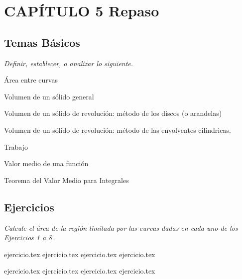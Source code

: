 
\section*{CAPÍTULO 5 \quad Repaso}

\subsection*{Temas Básicos}

\noindent \textit{Definir, establecer, o analizar lo siguiente.}
\begin{enumerate}
    \begin{minipage}{0.45\textwidth}
    \item Área entre curvas
    \item Volumen de un sólido general
    \item Volumen de un sólido de revolución: método de los discos (o arandelas)
    \item Volumen de un sólido de revolución: método de las envolventes cilíndricas.
    \end{minipage}%
    \begin{minipage}{0.45\textwidth}
    \item Trabajo
    \item Valor medio de una función
    \item Teorema del Valor Medio para Integrales
    \end{minipage}
\end{enumerate}

\subsection*{Ejercicios}

\noindent \textit{Calcule el área de la región limitada por las curvas dadas en cada uno de los Ejercicios 1 a 8.}

\begin{enumerate}
    \begin{minipage}{0.45\textwidth}
    {ejercicio.tex}
    {ejercicio.tex}
    {ejercicio.tex}
    {ejercicio.tex}
    \end{minipage}%
    \begin{minipage}{0.45\textwidth}
    {ejercicio.tex}
    {ejercicio.tex}
    {ejercicio.tex}
    {ejercicio.tex}
    \end{minipage}
\end{enumerate}

